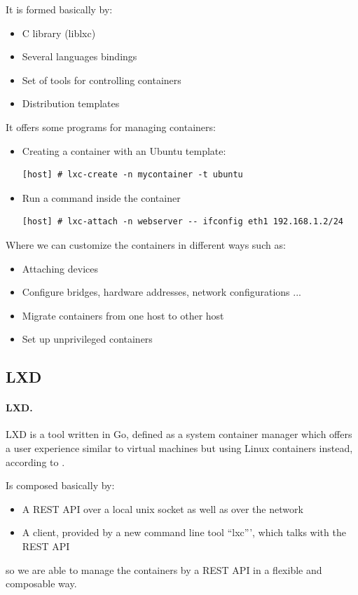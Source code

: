 It is formed basically by:
\begin{itemize}
	\item{C library (liblxc)}
	\item{Several languages bindings}
	\item{Set of tools for controlling containers}
	\item{Distribution templates}
\end{itemize}

It offers some programs for managing containers:
\begin{itemize}
	\item{Creating a container with an Ubuntu template}:
	      \begin{verbatim}
[host] # lxc-create -n mycontainer -t ubuntu
	\end{verbatim}
	\item{Run a command inside the container}
	      \begin{verbatim}
[host] # lxc-attach -n webserver -- ifconfig eth1 192.168.1.2/24
	\end{verbatim}
\end{itemize}

Where we can customize the containers in different ways such as:
\begin{itemize}
	\item{Attaching devices}
	\item{Configure bridges, hardware addresses, network configurations ...}
	\item{Migrate containers from one host to other host}
	\item{Set up unprivileged containers}
\end{itemize}

\subsection{LXD}
\paragraph{LXD.} LXD is a tool written in Go, defined as a system container manager which offers a user experience similar to virtual machines but using Linux containers instead, according to \cite{lxd}.

Is composed basically by:
\begin{itemize}
	\item{A REST API over a local unix socket as well as over the network}
	\item{A client, provided by a new command line tool ``lxc''', which talks with the REST API}
\end{itemize}
so we are able to manage the containers by a REST API in a flexible and composable way.

